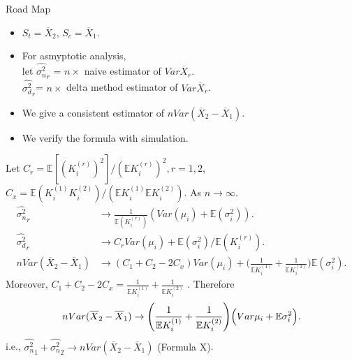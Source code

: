 \documentclass[xcolor=x11names,table]{beamer}
\newcommand{\bbe}{\mathbb{E}}
\newcommand{\wht}{\widehat}
\newcommand{\var}{Var}
\newcommand{\xbar}{\overline{X}}
\newcommand{\naiveest}{\wht{\sigma^2_n}}
\newcommand{\deltaest}{\wht{\sigma^2_d}}
\begin{document}

\begin{frame}{Road Map}
\small
\begin{itemize}
\item $S_t = \xbar_2$, $S_c=\xbar_1$.
\item For asmyptotic analysis, \\
let $\naiveest_r$ = $n\times$ naive estimator of $\var \xbar_r$.\\
$\deltaest_r $=  $n\times$ delta method estimator of  $\var \xbar_r$.
\item We give a consistent estimator of $n\var(\xbar_2-\xbar_1)$.
\item We verify the formula with simulation. 
\end{itemize}
\end{frame}

\begin{frame}
\small
\begin{theorem}
Let $C_r = \bbe[ (K_i^{(r)})^2] / (\bbe K_i^{(r)})^2,r=1,2$, $C_x = \bbe (K_i^{(1)}K_i^{(2)})/(\bbe K_i^{(1)}\bbe K_i^{(2)})$. As $n\to \infty$. 
\begin{align*}
\naiveest_r &\to  \frac{1}{\bbe(K_i^{(r)})} (\var(\mu_i)+\bbe(\sigma_i^2)). \\
\deltaest_r &\to C_r \var(\mu_i) + \bbe(\sigma^2_i)/\bbe (K_i^{(r)}).\\
  n\var(\xbar_2-\xbar_1) &\to (C_1+C_2-2C_x) \var(\mu_i) + \Biggl(\frac{1}{\bbe K_i^{(1)}}+\frac{1}{\bbe K_i^{(2)}}\Biggr )\bbe(\sigma^2_i).
\end{align*}
Moreover, $C_1+C_2-2C_x= \frac{1}{\bbe K_i^{(1)}}+\frac{1}{\bbe K_i^{(2)}}$ . Therefore
\begin{align*}
n\var(\xbar_2-\xbar_1) \to\Biggl(\frac{1 }{\bbe K_i^{(1)}}+\frac{1}{\bbe K_i^{(2)}}\Biggr) \Bigl( \var \mu_i + \bbe \sigma_i^2\Bigr).
\end{align*}
i.e., \alert{ $\naiveest_1+\naiveest_2 \to n\var(\xbar_2-\xbar_1)$  \quad (Formula X)}.
\end{theorem}
\end{frame}
\end{document}
